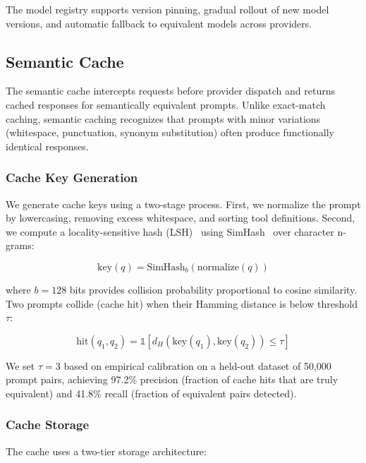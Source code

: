 \documentclass[11pt,twocolumn]{article}
\begin{document}
The model registry supports version pinning, gradual rollout of new model versions, and automatic fallback to equivalent models across providers.

\subsection{Semantic Cache}
\label{sec:caching}

The semantic cache intercepts requests before provider dispatch and returns cached responses for semantically equivalent prompts. Unlike exact-match caching, semantic caching recognizes that prompts with minor variations (whitespace, punctuation, synonym substitution) often produce functionally identical responses.

\subsubsection{Cache Key Generation}

We generate cache keys using a two-stage process. First, we normalize the prompt by lowercasing, removing excess whitespace, and sorting tool definitions. Second, we compute a locality-sensitive hash (LSH)~\cite{indyk1998approximate} using SimHash~\cite{charikar2002similarity} over character n-grams:

\begin{equation}
\text{key}(q) = \text{SimHash}_{b}(\text{normalize}(q))
\end{equation}

where $b = 128$ bits provides collision probability proportional to cosine similarity. Two prompts collide (cache hit) when their Hamming distance is below threshold $\tau$:

\begin{equation}
\text{hit}(q_1, q_2) = \mathbb{1}[d_H(\text{key}(q_1), \text{key}(q_2)) \leq \tau]
\end{equation}

We set $\tau = 3$ based on empirical calibration on a held-out dataset of 50,000 prompt pairs, achieving 97.2\% precision (fraction of cache hits that are truly equivalent) and 41.8\% recall (fraction of equivalent pairs detected).

\subsubsection{Cache Storage}

The cache uses a two-tier storage architecture:
\end{document}
